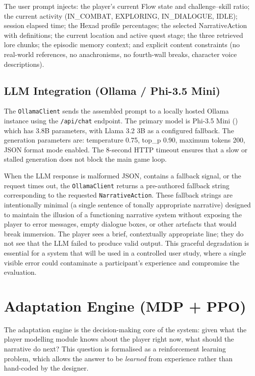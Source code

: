 The user prompt injects: the player's current Flow state and challenge--skill ratio; the current activity (IN\_COMBAT, EXPLORING, IN\_DIALOGUE, IDLE); session elapsed time; the Hexad profile percentages; the selected NarrativeAction with definitions; the current location and active quest stage; the three retrieved lore chunks; the episodic memory context; and explicit content constraints (no real-world references, no anachronisms, no fourth-wall breaks, character voice descriptions).

\subsection{LLM Integration (Ollama / Phi-3.5 Mini)}

The \texttt{OllamaClient} sends the assembled prompt to a locally hosted Ollama instance using the \texttt{/api/chat} endpoint. The primary model is Phi-3.5 Mini (\citealp{microsoft2024phi}) which has 3.8B parameters, with Llama 3.2 3B as a configured fallback. The generation parameters are: temperature 0.75, top\_p 0.90, maximum tokens 200, JSON format mode enabled. The 8-second HTTP timeout ensures that a slow or stalled generation does not block the main game loop.

When the LLM response is malformed JSON, contains a fallback signal, or the request times out, the \texttt{OllamaClient} returns a pre-authored fallback string corresponding to the requested \texttt{NarrativeAction}. These fallback strings are intentionally minimal (a single sentence of tonally appropriate narrative) designed to maintain the illusion of a functioning narrative system without exposing the player to error messages, empty dialogue boxes, or other artefacts that would break immersion. The player sees a brief, contextually appropriate line; they do not see that the LLM failed to produce valid output. This graceful degradation is essential for a system that will be used in a controlled user study, where a single visible error could contaminate a participant's experience and compromise the evaluation.

\section{Adaptation Engine (MDP + PPO)}

The adaptation engine is the decision-making core of the system: given what the player modelling module knows about the player right now, what should the narrative do next? This question is formalised as a reinforcement learning problem, which allows the answer to be \textit{learned} from experience rather than hand-coded by the designer.

